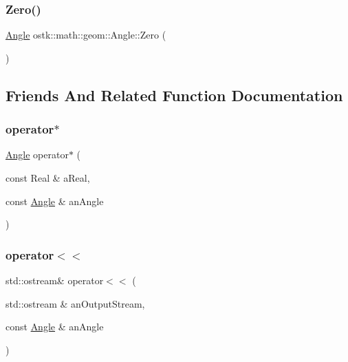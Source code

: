 \subsubsection{\texorpdfstring{Zero()}{Zero()}}
{\footnotesize\ttfamily \hyperlink{classostk_1_1math_1_1geom_1_1_angle}{Angle} ostk\+::math\+::geom\+::\+Angle\+::\+Zero (\begin{DoxyParamCaption}{ }\end{DoxyParamCaption})\hspace{0.3cm}{\ttfamily [static]}}



\subsection{Friends And Related Function Documentation}
\mbox{\label{classostk_1_1math_1_1geom_1_1_angle_af699984b24759466957ecddaa7e61fc9}} 
\subsubsection{\texorpdfstring{operator$\ast$}{operator*}}
{\footnotesize\ttfamily \hyperlink{classostk_1_1math_1_1geom_1_1_angle}{Angle} operator$\ast$ (\begin{DoxyParamCaption}\item[{const Real \&}]{a\+Real,  }\item[{const \hyperlink{classostk_1_1math_1_1geom_1_1_angle}{Angle} \&}]{an\+Angle }\end{DoxyParamCaption})\hspace{0.3cm}{\ttfamily [friend]}}

\mbox{\label{classostk_1_1math_1_1geom_1_1_angle_a0846b77ee3281e8a559197c3c3208eed}} 
\subsubsection{\texorpdfstring{operator$<$$<$}{operator<<}}
{\footnotesize\ttfamily std\+::ostream\& operator$<$$<$ (\begin{DoxyParamCaption}\item[{std\+::ostream \&}]{an\+Output\+Stream,  }\item[{const \hyperlink{classostk_1_1math_1_1geom_1_1_angle}{Angle} \&}]{an\+Angle }\end{DoxyParamCaption})\hspace{0.3cm}{\ttfamily [friend]}}



